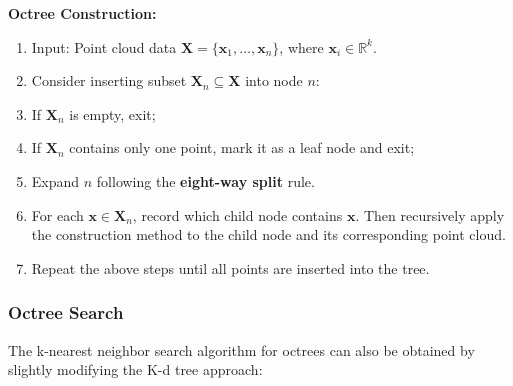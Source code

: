 \begin{mdframed}
	\textbf{Octree Construction:}
	\begin{enumerate}
		\item Input: Point cloud data $\mathbf{X} = \{\mathbf{x}_1, \ldots, \mathbf{x}_n\}$, where $\mathbf{x}_i \in \mathbb{R}^{k}$.
		\item Consider inserting subset $\mathbf{X}_n \subseteq \mathbf{X}$ into node $n$:
		\item If $\mathbf{X}_n$ is empty, exit;
		\item If $\mathbf{X}_n$ contains only one point, mark it as a leaf node and exit;
		\item Expand $n$ following the \textbf{eight-way split} rule.
		\item For each $\mathbf{x} \in \mathbf{X}_n$, record which child node contains $\mathbf{x}$. Then recursively apply the construction method to the child node and its corresponding point cloud.
		\item Repeat the above steps until all points are inserted into the tree.
	\end{enumerate}
\end{mdframed}

\subsubsection{Octree Search}
The k-nearest neighbor search algorithm for octrees can also be obtained by slightly modifying the K-d tree approach:

